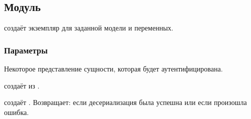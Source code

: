 \subsection{Модуль }\label{page-FPauth-core-module-FPauth+u+core-module-Authenticator-module-Make}%
 создаёт экземпляр \hyperref[page-FPauth-core-module-FPauth+u+core-module-Auth+u+sign-module-type-AUTHENTICATOR]{} для заданной модели и переменных.

\subsubsection{Параметры\label{parameters}}%
\label{page-FPauth-core-module-FPauth+u+core-module-Authenticator-module-Make-argument-1-M}\begin{ocamlindent}\label{page-FPauth-core-module-FPauth+u+core-module-Authenticator-module-Make-argument-1-M-type-t}\begin{ocamlindent}Некоторое представление сущности, которая будет аутентифицирована.\end{ocamlindent}%
\medbreak
\label{page-FPauth-core-module-FPauth+u+core-module-Authenticator-module-Make-argument-1-M-val-serialize}\begin{ocamlindent} создаёт  из \hyperref[page-FPauth-core-module-FPauth+u+core-module-Authenticator-module-Make-argument-1-M-type-t]{}.\end{ocamlindent}%
\medbreak
\label{page-FPauth-core-module-FPauth+u+core-module-Authenticator-module-Make-argument-1-M-val-deserialize}\begin{ocamlindent} создаёт \hyperref[page-FPauth-core-module-FPauth+u+core-module-Authenticator-module-Make-argument-1-M-type-t]{}. Возвращает:  если десериализация была успешна или  если произошла ошибка.\end{ocamlindent}%

\end{ocamlindent}

